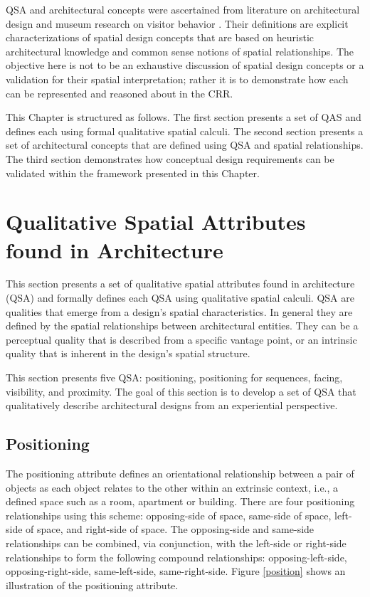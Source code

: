 \documentclass[12pt]{ucthesis}
\begin{document}
QSA and architectural concepts were ascertained from literature on architectural design \cite{formfunction} \cite{pattern-language} \cite{Bayazit} and museum research on visitor behavior \cite{Melton} \cite{Bitgood92} \cite{Falk} \cite{Stavroulaki}. Their definitions are explicit characterizations of spatial design concepts that are based on heuristic architectural knowledge and common sense notions of spatial relationships. The objective here is not to be an exhaustive discussion of spatial design concepts or a validation for their spatial interpretation; rather it is to demonstrate how each can be represented and reasoned about in the CRR. 

This Chapter is structured as follows. The first section presents a set of QAS and defines each using formal qualitative spatial calculi. The second section presents a set of architectural concepts that are defined using QSA and spatial relationships. The third section demonstrates how conceptual design requirements can be validated within the framework presented in this Chapter.


\section{Qualitative Spatial Attributes found in Architecture}
This section presents a set of qualitative spatial attributes found in architecture (QSA) and formally defines each QSA using qualitative spatial calculi. QSA are qualities that emerge from a design's spatial characteristics. In general they are defined by the spatial relationships between architectural entities. They can be a perceptual quality that is described from a specific vantage point, or an intrinsic quality that is inherent in the design's spatial structure. 

This section presents five QSA: positioning, positioning for sequences, facing, visibility, and proximity. The goal of this section is to develop a set of QSA that qualitatively describe architectural designs from an experiential perspective. 


\subsection{Positioning}
The positioning attribute defines an orientational relationship between a pair of objects as each object relates to the other within an extrinsic context, i.e., a defined space such as a room, apartment or building. There are four positioning relationships using this scheme: opposing-side of space, same-side of space, left-side of space, and right-side of space. The opposing-side and same-side relationships can be combined, via conjunction, with the left-side or right-side relationships to form the following compound relationships: opposing-left-side, opposing-right-side, same-left-side, same-right-side. Figure \ref{position} shows an illustration of the positioning attribute.
\end{document}
